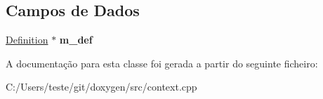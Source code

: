 \subsection*{Campos de Dados}
\begin{DoxyCompactItemize}
\item 
\hypertarget{class_nesting_node_context_1_1_private_a03cb3003c6878887e3ebcce9bfd8f28e}{\hyperlink{class_definition}{Definition} $\ast$ {\bfseries m\-\_\-def}}\label{class_nesting_node_context_1_1_private_a03cb3003c6878887e3ebcce9bfd8f28e}

\end{DoxyCompactItemize}


A documentação para esta classe foi gerada a partir do seguinte ficheiro\-:\begin{DoxyCompactItemize}
\item 
C\-:/\-Users/teste/git/doxygen/src/context.\-cpp\end{DoxyCompactItemize}
